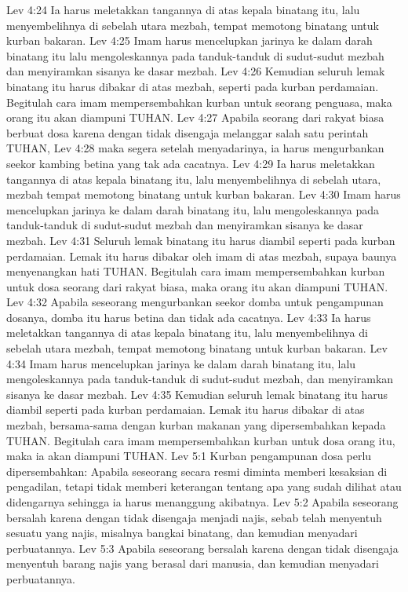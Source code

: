 Lev 4:24  Ia harus meletakkan tangannya di atas kepala binatang itu, lalu menyembelihnya di sebelah utara mezbah, tempat memotong binatang untuk kurban bakaran.
Lev 4:25  Imam harus mencelupkan jarinya ke dalam darah binatang itu lalu mengoleskannya pada tanduk-tanduk di sudut-sudut mezbah dan menyiramkan sisanya ke dasar mezbah.
Lev 4:26  Kemudian seluruh lemak binatang itu harus dibakar di atas mezbah, seperti pada kurban perdamaian. Begitulah cara imam mempersembahkan kurban untuk seorang penguasa, maka orang itu akan diampuni TUHAN.
Lev 4:27  Apabila seorang dari rakyat biasa berbuat dosa karena dengan tidak disengaja melanggar salah satu perintah TUHAN,
Lev 4:28  maka segera setelah menyadarinya, ia harus mengurbankan seekor kambing betina yang tak ada cacatnya.
Lev 4:29  Ia harus meletakkan tangannya di atas kepala binatang itu, lalu menyembelihnya di sebelah utara, mezbah tempat memotong binatang untuk kurban bakaran.
Lev 4:30  Imam harus mencelupkan jarinya ke dalam darah binatang itu, lalu mengoleskannya pada tanduk-tanduk di sudut-sudut mezbah dan menyiramkan sisanya ke dasar mezbah.
Lev 4:31  Seluruh lemak binatang itu harus diambil seperti pada kurban perdamaian. Lemak itu harus dibakar oleh imam di atas mezbah, supaya baunya menyenangkan hati TUHAN. Begitulah cara imam mempersembahkan kurban untuk dosa seorang dari rakyat biasa, maka orang itu akan diampuni TUHAN.
Lev 4:32  Apabila seseorang mengurbankan seekor domba untuk pengampunan dosanya, domba itu harus betina dan tidak ada cacatnya.
Lev 4:33  Ia harus meletakkan tangannya di atas kepala binatang itu, lalu menyembelihnya di sebelah utara mezbah, tempat memotong binatang untuk kurban bakaran.
Lev 4:34  Imam harus mencelupkan jarinya ke dalam darah binatang itu, lalu mengoleskannya pada tanduk-tanduk di sudut-sudut mezbah, dan menyiramkan sisanya ke dasar mezbah.
Lev 4:35  Kemudian seluruh lemak binatang itu harus diambil seperti pada kurban perdamaian. Lemak itu harus dibakar di atas mezbah, bersama-sama dengan kurban makanan yang dipersembahkan kepada TUHAN. Begitulah cara imam mempersembahkan kurban untuk dosa orang itu, maka ia akan diampuni TUHAN.
Lev 5:1  Kurban pengampunan dosa perlu dipersembahkan: Apabila seseorang secara resmi diminta memberi kesaksian di pengadilan, tetapi tidak memberi keterangan tentang apa yang sudah dilihat atau didengarnya sehingga ia harus menanggung akibatnya.
Lev 5:2  Apabila seseorang bersalah karena dengan tidak disengaja menjadi najis, sebab telah menyentuh sesuatu yang najis, misalnya bangkai binatang, dan kemudian menyadari perbuatannya.
Lev 5:3  Apabila seseorang bersalah karena dengan tidak disengaja menyentuh barang najis yang berasal dari manusia, dan kemudian menyadari perbuatannya.

